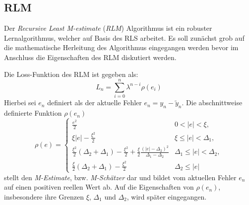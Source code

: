 \documentclass[a4paper, 12pt]{article}
\begin{document}
\subsection{RLM}
\label{sec:rlm:rlm}
Der \emph{Recursive Least M-estimate} (\emph{RLM}) Algorithmus \cite{zou2000recursive} ist ein robuster Lernalgorithmus, welcher auf Basis des RLS arbeitet.
Es soll zunächst grob auf die mathematische Herleitung des Algorithmus eingegangen werden bevor im Anschluss die Eigenschaften des RLM diskutiert werden.

\vspace{5mm}
Die Loss-Funktion des RLM ist gegeben als:
\begin{equation*}
    \label{eq:rlm:rlm:l}
    L_n=\sum_{i = 0}^{n}\lambda^{n-i}\rho(e_i)
\end{equation*}
Hierbei sei $e_n$ definiert als der aktuelle Fehler $e_n = y_n - \tilde{y}_n$.
Die abschnittweise definierte Funktion $\rho(e_n)$ 
\begin{equation*} 
\rho(e)=\begin{cases}
    \label{eq:rlm:rlm:p}
      \frac{e^2}{2} & 0 < |e| < \xi, \\
      \xi |e| - \frac{\xi^2}{2} & \xi \leq |e| < \Delta_1, \\
      \frac{\xi^2}{2}(\Delta_2 + \Delta_1) - \frac{\xi^2}{2} + \frac{\xi}{2} \frac{(|e|-\Delta_2)^2}{\Delta_1-\Delta_2}& \Delta_1 \leq |e| < \Delta_2, \\
      \frac{\xi}{2}(\Delta_2+\Delta_1) - \frac{\xi^2}{2} & \Delta_2 \leq |e|
   \end{cases}
\end{equation*}
stellt den \emph{M-Estimate}, bzw. \emph{M-Schätzer} dar und bildet vom aktuellen Fehler $e_n$ auf einen positiven reellen Wert ab. Auf die Eigenschaften von $\rho(e_n)$, insbesondere ihre Grenzen $\xi$, $\Delta_1$ und $\Delta_2$, wird später eingegangen.
\end{document}
